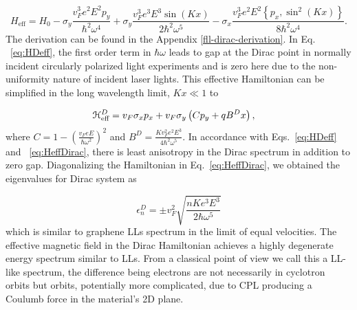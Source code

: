 \begin{equation} \label{eq:HDeff}
  H_{\text{eff}}= H_{0}-\sigma_y\frac{v_F^3 e^2 E^2 p_y}{\hbar^{2}\omega^{4}}
  +\sigma_y\frac{v_F^3 e^3 E^{3}\sin{(Kx)}}{2\hbar^{2}\omega^{5}}
  -\sigma_x\frac{v_F^3 e^2 E^2 \left\{p_x, \sin^2{(Kx)} \right\} }{8\hbar^{2}\omega^{4}}.
\end{equation}
The derivation can be found in the Appendix \ref{fll-dirac-derivation}.
In Eq. ~\eqref{eq:HDeff}, the first order term in $\hbar \omega$ leads to gap at the Dirac point in normally incident circularly polarized light experiments \cite{YHW, JWM} and is zero here due to the non-uniformity nature of incident laser lights.
This effective Hamiltonian can be simplified in the long wavelength limit, $Kx \ll 1$ to

\begin{align} \label{eq:HeffDirac}
  \mathcal{H}_{\text{eff}}^D &= v_{F}\sigma_{x}p_{x}+v_F\sigma_{y} \left( C p_{y} + qB^Dx \right),
\end{align}%
where $C = 1-\left(\tfrac{v_{F}eE}{\hbar\omega^2}\right)^2$ and $B^D=\frac{Kv_F^2 e^2E^3}{4\hbar^{2}\omega^{5}}$.
In accordance with Eqs.~\eqref{eq:HDeff} and ~\eqref{eq:HeffDirac}, there is least anisotropy in the Dirac spectrum in addition to zero gap.
Diagonalizing the Hamiltonian in Eq.~\eqref{eq:HeffDirac}, we obtained the eigenvalues for Dirac system as%

\begin{equation} \label{eq:DiracEner}
  \epsilon_{n}^D = \pm v_F^2 \sqrt{\dfrac{nK e^3 E^3}{2 \hbar \omega^5}}
\end{equation}
which is similar to graphene LLs spectrum in the limit of equal velocities.
The effective magnetic field in the Dirac Hamiltonian achieves a highly degenerate energy spectrum similar to LLs.
From a classical point of view we call this a LL-like spectrum, the difference being electrons are not necessarily in cyclotron orbits but orbits, potentially more complicated, due to CPL producing a Coulumb force in the material's 2D plane.

